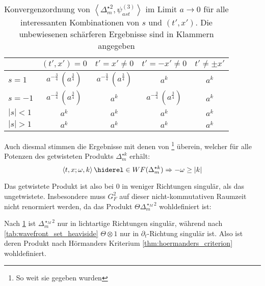 \begin{table}[h]
\centering
\begin{tabular}{l|cccc}
        & $(t',x') = 0$     & $t'=x' \neq 0$    & $t'=-x' \neq 0$   & $t' \neq \pm x'$ \\ \hline
$s=1$   & $a^{-\frac{3}{4}}\, (a^{\frac{3}{4}})$  & $a^{-\frac{3}{4}}\, (a^{\frac{3}{4}})$ & $a^k$             & $a^k$            \\
$s=-1$  & $a^{-\frac{3}{4}}\, (a^{\frac{3}{4}})$ & $a^k$             & $a^{-\frac{3}{4}}\, (a^{\frac{3}{4}})$ & $a^k$            \\
$|s|<1$ & $a^k$             & $a^k$             & $a^k$             & $a^k$            \\
$|s|>1$ & $a^k$             & $a^k$             & $a^k$             & $a^k$
\end{tabular}
\caption{Konvergenzordnung von $\left<\Delta_m^{\star 2},\psi_{ast}^{(3)}\right>$ im Limit $a \to 0$ für alle interessanten Kombinationen von $s$ und $(t',x')$. Die unbewiesenen schärferen Ergebnisse sind in Klammern angegeben}
\label{tab:wavefrontset_delta_m2_twisted}
\end{table}

Auch diesmal stimmen die Ergebnisse mit denen von \textcite[Prop. 3.72]{Schulz2014}\footnote{So weit sie gegeben wurden} überein, welcher für alle Potenzen des getwisteten Produkts $\Delta_m^{\star k}$ erhält:
\begin{equation*}
\left\langle t,x; \omega, k \right\rangle \hiderel\in WF(\Delta_m^{\star k})
\Rightarrow
- \omega \geq |k|
\end{equation*}

Das getwistete Produkt ist also bei $0$ in weniger Richtungen singulär, als das ungetwistete. Insbesondere muss $G_F^2$ auf dieser nicht-kommutativen Raumzeit nicht renormiert werden, da das Produkt $\Theta \Delta_m^{\star_M 2}$ wohldefiniert ist:

\begin{corollary}
Nach \cref{tab:wavefrontset_delta_m2_twisted} ist $\Delta_m^{\star_M 2}$ nur in lichtartige Richtungen singulär, während nach \cref{tab:wavefront_set_heaviside} $\Theta\otimes 1$ nur in $\partial_t$-Richtung singulär ist. Also ist deren Produkt nach Hörmanders Kriterium \cref{thm:hoermanders_criterion} wohldefiniert.
\end{corollary}




